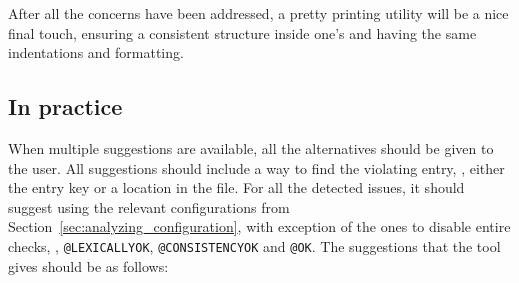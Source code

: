 After all the concerns have been addressed, a pretty printing utility
will be a nice final touch, ensuring a consistent structure inside one's
 and having the same indentations and formatting.

\subsection{In practice}
\label{sec:organizing_practice}

When multiple suggestions are available, all the alternatives should
be given to the user.  All suggestions should include a way to find
the violating entry, \ie, either the entry key or a location in the
file.  For all the detected issues, it should suggest using the
relevant configurations from
Section~\ref{sec:analyzing_configuration}, with exception of the ones
to disable entire checks, \ie, \texttt{@LEXICALLYOK},
\texttt{@CONSISTENCYOK} and \texttt{@OK}.  The suggestions that the
tool gives should be as follows:

